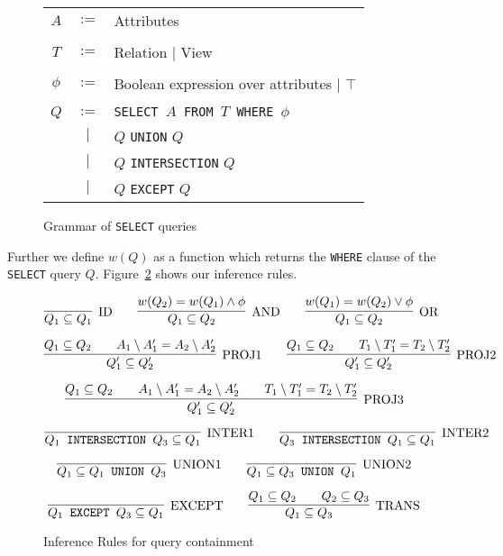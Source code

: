 \begin{figure}[!ht]

\begin{tabular}{c c l}
$A$ & $:=$ & Attributes \\
    & & \\
$T$ & $:=$ & Relation $|$ View \\
    & & \\
$\phi$ & $:=$ & Boolean expression over attributes $|$ $\top$ \\
    & & \\
$Q$ & $:=$ & \texttt{SELECT $A$ FROM $T$ WHERE $\phi$} \\
    & $|$  & $Q$ \texttt{UNION} $Q$ \\
    & $|$  & $Q$ \texttt{INTERSECTION} $Q$ \\
    & $|$  & $Q$ \texttt{EXCEPT} $Q$ \\

\end{tabular}

\caption{Grammar of \texttt{SELECT} queries}
\label{figure:algorithms:grammar}
\end{figure}
%
Further we define $w(Q)$ as a function which returns the \texttt{WHERE} clause of the \texttt{SELECT} query $Q$.
%
Figure~\ref{figure:algorithms:infrules} shows our inference rules.
%
\begin{figure}[!ht]
\[
\infer[\text{ID}]
	{Q_1 \subseteq Q_1}
	{}
\qquad	
\infer[\text{AND}]
	{Q_1 \subseteq Q_2}
	{w(Q_2) = w(Q_1) \land \phi}
\qquad
\infer[\text{OR}]
	{Q_1 \subseteq Q_2}
	{w(Q_1) = w(Q_2) \lor \phi}
\]

\[
\infer[\text{PROJ1}]
	{Q_1' \subseteq Q_2'}
	{Q_1 \subseteq Q_2 \qquad A_1 \setminus A_1' = A_2 \setminus A_2'}
\qquad
\infer[\text{PROJ2}]
	{Q_1' \subseteq Q_2'}
	{Q_1 \subseteq Q_2 \qquad T_1 \setminus T_1' = T_2 \setminus T_2'}
\]

\[
\infer[\text{PROJ3}]
	{Q_1' \subseteq Q_2'}
	{Q_1 \subseteq Q_2 \qquad A_1 \setminus A_1' = A_2 \setminus A_2' \qquad T_1 \setminus T_1' = T_2 \setminus T_2'}
\]


\[
\infer[\text{INTER1}]
	{Q_1 \text{\texttt{ INTERSECTION }} Q_3 \subseteq Q_1}
	{}
\qquad
\infer[\text{INTER2}]
	{Q_3 \text{\texttt{ INTERSECTION }} Q_1 \subseteq Q_1}
	{}
\]

\[
\infer[\text{UNION1}]
	{Q_1 \subseteq Q_1 \text{\texttt{ UNION }} Q_3}
	{}
\qquad
\infer[\text{UNION2}]
	{Q_1 \subseteq Q_3 \text{\texttt{ UNION }} Q_1}
	{}
\]

\[
\infer[\text{EXCEPT}]
	{Q_1 \text{\texttt{ EXCEPT }} Q_3 \subseteq Q_1}
	{}
\qquad
\infer[\text{TRANS}]
	{Q_1 \subseteq Q_3}
	{Q_1 \subseteq Q_2 \qquad Q_2 \subseteq Q_3}
\]
\caption{Inference Rules for query containment}
\label{figure:algorithms:infrules}
\end{figure}

